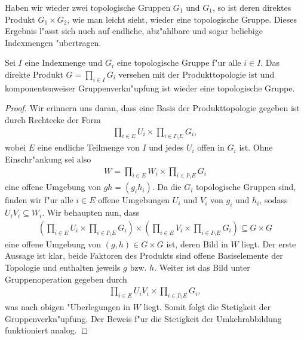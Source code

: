 	Haben wir wieder zwei topologische Gruppen $G_1$ und $G_1$, so ist deren direktes Produkt $G_1\times G_2$, wie man leicht sieht, wieder eine topologische Gruppe.
	Dieses Ergebnis l"asst sich nuch auf endliche, abz"ahlbare und sogar beliebige Indexmengen "ubertragen. 
	\begin{lemma}
	\label{lemma:direktesProduktTopologischerGruppen}
		Sei $I$ eine Indexmenge und $G_i$ eine topologische Gruppe f"ur alle $i \in I$. 
		Das direkte Produkt $G = \prod_{i \in I} G_i$ versehen mit der Produkttopologie ist und komponentenweiser Gruppenverkn"upfung ist wieder eine topologische Gruppe.
	\end{lemma}
	\begin{proof}
		Wir erinnern uns daran, dass eine Basis der Produkttopologie gegeben ist durch Rechtecke der Form
		\begin{align*}
			\prod_{i \in E} U_i \times \prod_{i \in I\setminus E}  G_i,
		\end{align*}
		wobei $E$ eine endliche Teilmenge von $I$ und jedes $U_i$ offen in $G_i$ ist. 
		Ohne Einschr"ankung sei also 
		\begin{align*}
			W = \prod_{i \in E} W_i \times \prod_{i \in I\setminus E}  G_i
		\end{align*}
		eine offene Umgebung von $gh = (g_i h_i)$. 
		Da die $G_i$ topologische Gruppen sind, finden wir f"ur  alle $i\in E$ offene Umgebungen $U_i$ und $V_i$ von $g_i$ und $h_i$,  sodass  $U_i V_i \subseteq W_i$. Wir behaupten nun, dass
		\begin{align*}
			(\prod_{i \in E} U_i \times \prod_{i \in I\setminus E}  G_i) \times (\prod_{i \in E} V_i \times \prod_{i \in I\setminus E}  G_i) \subseteq G \times G
		\end{align*}
		eine offene Umgebung von $(g, h) \in G \times G$ ist, deren Bild in $W$ liegt. 
		Der erste Aussage ist klar, beide Faktoren des Produkts sind offene Basiselemente der Topologie und enthalten jeweils $g$ bzw. $h$.
		Weiter ist das Bild unter Gruppenoperation gegeben durch
		\begin{align*}
			\prod_{i \in E} U_i V_i \times \prod_{i \in I\setminus E}  G_i,
		\end{align*}
		was nach obigen "Uberlegungen in $W$ liegt.
		Somit folgt die Stetigkeit der Gruppenverkn"upfung.
		Der Beweis f"ur die Stetigkeit der Umkehrabbildung funktioniert analog.
	\end{proof}
	
